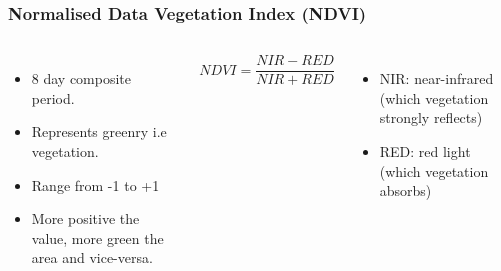 \begin{frame}
\frametitle{Normalised Data Vegetation Index (NDVI)}
\begin{columns}


\begin{itemize}
    \item 8 day composite period. 
    \item Represents greenry i.e vegetation.
    \item Range from -1 to +1
    \item More positive the value, more green the area and vice-versa.
\end{itemize}

\begin{equation} \label{eq:ndvi_formula}
       NDVI = \frac{NIR - RED}{NIR + RED}
    \end{equation} 
    
  \begin{itemize}
    \item NIR: near-infrared (which vegetation strongly reflects) 
    \item RED: red light (which vegetation absorbs)
  \end{itemize}



\end{columns}
\end{frame}
